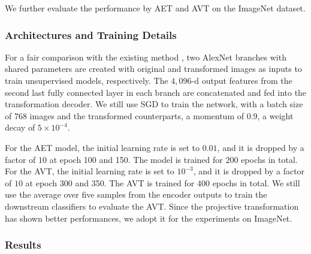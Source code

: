 \documentclass[10pt,journal,compsoc,twoside]{IEEEtran}
\begin{document}
We further evaluate the performance by AET and AVT on the ImageNet dataset.

\subsubsection{Architectures and Training Details}
For a fair comparison with the existing method \cite{noroozi2016unsupervised,bojanowski2017unsupervised,gidaris2018unsupervised}, two AlexNet branches with shared parameters are created with original and transformed images as inputs to train unsupervised models, respectively. The $4,096$-d output features from the second last fully connected layer in each branch are concatenated and fed into the transformation decoder. We still use SGD to train the network, with a batch size of $768$ images and the transformed counterparts, a momentum of $0.9$, a weight decay of $5\times 10^{-4}$.

For the AET model, the initial learning rate is set to $0.01$, and it is dropped by a factor of $10$ at epoch 100 and 150. The model is trained for $200$ epochs in total. For the AVT, the initial learning rate is set to $10^{-3}$, and it is dropped by a factor of $10$ at epoch 300 and 350. The AVT is trained for $400$ epochs in total. We still use the average over five samples from the encoder outputs to train the downstream classifiers to evaluate the AVT. Since the projective transformation has shown better performances, we adopt it for the experiments on ImageNet.

\subsubsection{Results}
\end{document}

